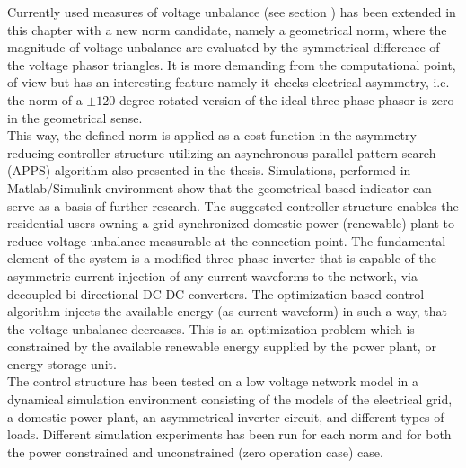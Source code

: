     Currently used measures of voltage unbalance (see section ) has been extended in this chapter with a new norm candidate, namely a geometrical norm, where the magnitude of voltage unbalance are evaluated by the symmetrical difference of the voltage phasor triangles. It is more demanding from the computational point, of view but has an interesting feature namely it checks electrical asymmetry, i.e. the norm of a $\pm120$ degree  rotated version of the ideal three-phase phasor is zero in the geometrical sense.\\
    This way, the defined norm is applied as a cost function in the asymmetry reducing controller structure utilizing an asynchronous parallel pattern search (APPS) algorithm also presented in the thesis. Simulations, performed in Matlab/Simulink environment show that the geometrical based indicator can serve as a basis of further research. The suggested controller structure enables the residential users owning a grid synchronized domestic power (renewable) plant to reduce voltage unbalance measurable at the connection point. The fundamental element of the system is a modified three phase inverter that is capable of the asymmetric current injection of any current waveforms to the network, via decoupled bi-directional DC-DC converters. The optimization-based control algorithm injects the available energy (as current waveform) in such a way, that the voltage unbalance decreases. This is an optimization problem which is constrained by the available renewable energy supplied by the power plant, or energy storage unit.\\
    The control structure has been tested on a low voltage network model in a dynamical simulation environment consisting of the models of the electrical grid, a domestic power plant, an asymmetrical inverter circuit, and different types of loads. Different simulation experiments has been run for each norm and for both the power constrained and unconstrained (zero operation case) case. %


